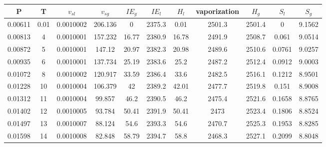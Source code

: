 \begin{longtable}{ccccccccccc}
\toprule
\textbf{P} & \textbf{T} & $v_{sl}$ & $v_{sg}$ & $IE_{g}$ & $IE_{l}$ & $H_l$ & vaporization & $H_g$ & $S_l$ & $S_g$ \\
\midrule
\endhead
0.00611  & 0.01        & 0.0010002              & 206.136             & 0                      & 2375.3              & 0.01            & 2501.3       & 2501.4       & 0              & 9.1562      \\
0.00813  & 4           & 0.0010001              & 157.232             & 16.77                  & 2380.9              & 16.78           & 2491.9       & 2508.7       & 0.061          & 9.0514      \\
0.00872  & 5           & 0.0010001              & 147.12              & 20.97                  & 2382.3              & 20.98           & 2489.6       & 2510.6       & 0.0761         & 9.0257      \\
0.00935  & 6           & 0.0010001              & 137.734             & 25.19                  & 2383.6              & 25.2            & 2487.2       & 2512.4       & 0.0912         & 9.0003      \\
0.01072  & 8           & 0.0010002              & 120.917             & 33.59                  & 2386.4              & 33.6            & 2482.5       & 2516.1       & 0.1212         & 8.9501      \\
0.01228  & 10          & 0.0010004              & 106.379             & 42                     & 2389.2              & 42.01           & 2477.7       & 2519.8       & 0.151          & 8.9008      \\
0.01312  & 11          & 0.0010004              & 99.857              & 46.2                   & 2390.5              & 46.2            & 2475.4       & 2521.6       & 0.1658         & 8.8765      \\
0.01402  & 12          & 0.0010005              & 93.784              & 50.41                  & 2391.9              & 50.41           & 2473         & 2523.4       & 0.1806         & 8.8524      \\
0.01497  & 13          & 0.0010007              & 88.124              & 54.6                   & 2393.3              & 54.6            & 2470.7       & 2525.3       & 0.1953         & 8.8285      \\
0.01598  & 14          & 0.0010008              & 82.848              & 58.79                  & 2394.7              & 58.8            & 2468.3       & 2527.1       & 0.2099         & 8.8048      \\

\end{longtable}
